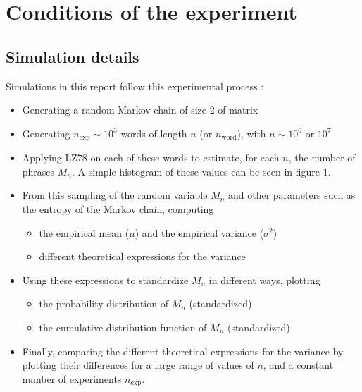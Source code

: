 






\medskip

\section{Conditions of the experiment}
\subsection{Simulation details}

Simulations in this report follow this experimental
process :
	
\begin{itemize}

	\item Generating a random Markov chain of size 2 of matrix
 \item
 Generating $n_{\text{exp}} \sim 10^3$ words of length $n $ (or $n_{\text{word}}$), with $n \sim 10^6 \text{ or } 10^7$
 
 \item Applying LZ78 on each of these words to estimate, for each $n$,
 the number of phrases $M_n$. A simple histogram of these values
 can be seen in figure 1.
 
 \item From this sampling of the random variable $M_n$ and other parameters such as the entropy of the Markov chain, computing
 
 	\begin{itemize}
 		\item the empirical mean ($\mu$) and the empirical variance ($\sigma^2$)
 		\item different theoretical expressions for the variance
 	\end{itemize}
 	
 \item Using these expressions to standardize $M_n$ in different ways, plotting
 
 	\begin{itemize}
 		\item the probability distribution of $M_n$ (standardized)
 			  
 		\item the cumulative distribution function of $M_n$ (standardized)
 	\end{itemize}
 
 \item Finally, comparing the different theoretical expressions for the variance 
 by plotting their differences for a large range of values of $n$, and
 a constant number of experiments $n_{\text{exp}}$.
\end{itemize}

